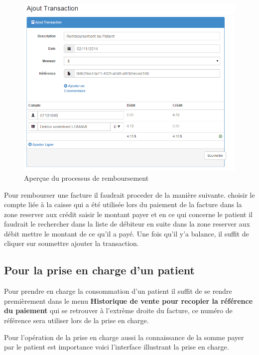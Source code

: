 \documentclass[12pt,a4paper]{report}
\begin{document}
\begin{figure}[h]
\begin{center}
\includegraphics[width=12cm]{pic/AjouTrans.png}
\end{center}
\caption{Aperçue du processus de remboursement}
\label{Aperçue du processus de remboursement}
\end{figure}

Pour rembourser une facture il faudrait proceder de la manière suivante. choisir le compte liée à la caisse qui a été utilisée lors du paiement de la facture dans la zone reserver aux crédit saisir le montant payer et en ce qui concerne le patient il faudrait le rechercher dans la liste de débiteur en suite dans la zone reserver aux débit mettre le montant de ce qu'il a payé.
Une fois qu'il y'a balance, il suffit de cliquer sur soumettre ajouter la transaction.
\newpage
\subsection{Pour la prise en charge d'un patient}
Pour prendre en charge la consommation d'un patient il suffit de se rendre premièrement dans le menu \textbf{Historique de vente pour recopier la référence du paiement} qui se retrouver à l'extrème droite du facture, ce numéro de référence sera utiliser lors de la prise en charge.

Pour l'opération de la prise en charge aussi la connaissance de la somme payer par le patient est importance voici l'interface illustrant la prise en charge.
\end{document}
